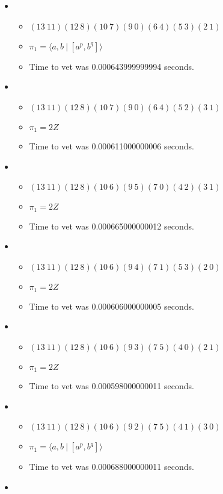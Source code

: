 \documentclass{article}
\begin{document}
\begin{itemize}
\item \begin{itemize}
      \item $(13\ 11)(12\ 8)(10\ 7)(9\ 0)(6\ 4)(5\ 3)(2\ 1)$
      \item $\pi_1 = \langle a,b\ |\ [a^p,b^q]\rangle$
      \item Time to vet was 0.000643999999994 seconds.
\end{itemize}
\item \begin{itemize}
      \item $(13\ 11)(12\ 8)(10\ 7)(9\ 0)(6\ 4)(5\ 2)(3\ 1)$
      \item $\pi_1 =2 Z$
      \item Time to vet was 0.000611000000006 seconds.
\end{itemize}
\item \begin{itemize}
      \item $(13\ 11)(12\ 8)(10\ 6)(9\ 5)(7\ 0)(4\ 2)(3\ 1)$
      \item $\pi_1 =2 Z$
      \item Time to vet was 0.000665000000012 seconds.
\end{itemize}
\item \begin{itemize}
      \item $(13\ 11)(12\ 8)(10\ 6)(9\ 4)(7\ 1)(5\ 3)(2\ 0)$
      \item $\pi_1 =2 Z$
      \item Time to vet was 0.000606000000005 seconds.
\end{itemize}
\item \begin{itemize}
      \item $(13\ 11)(12\ 8)(10\ 6)(9\ 3)(7\ 5)(4\ 0)(2\ 1)$
      \item $\pi_1 =2 Z$
      \item Time to vet was 0.000598000000011 seconds.
\end{itemize}
\item \begin{itemize}
      \item $(13\ 11)(12\ 8)(10\ 6)(9\ 2)(7\ 5)(4\ 1)(3\ 0)$
      \item $\pi_1 = \langle a,b\ |\ [a^p,b^q]\rangle$
      \item Time to vet was 0.000688000000011 seconds.
\end{itemize}
\item \begin{itemize}

\end{itemize}
\end{itemize}
\end{document}
